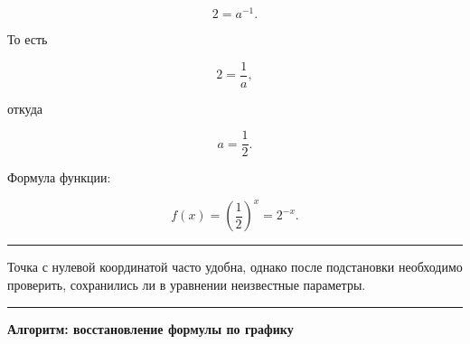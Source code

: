 \documentclass[a4paper,12pt]{article}
\newcommand{\keyidea}[1]{%
    \par\medskip
    {\color{accent}\rule{\linewidth}{0.6pt}}\par
    \smallskip
    #1
    \smallskip
    {\color{accent}\rule{\linewidth}{0.6pt}}\par
    \medskip
}
\begin{document}
\[
2=a^{-1}.
\]

То есть

\[
2=\frac1a,
\]

откуда

\[
a=\frac12.
\]

Формула функции:

\[
f(x)=\left(\frac12\right)^x
=
2^{-x}.
\]

\keyidea{
Точка с нулевой координатой часто удобна, однако после подстановки необходимо проверить, сохранились ли в уравнении неизвестные параметры.
}

\clearpage
\thispagestyle{plain}

\begin{center}
{\Large\bfseries\color{darkaccent}
Алгоритм: восстановление формулы по графику
}
\end{center}

\vspace{7mm}
\end{document}
